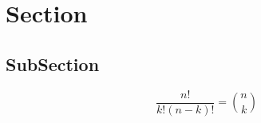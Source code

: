 \documentclass[a4paper]{article}
\begin{document}
\section{Section}

\subsection{SubSection}

\[ \frac{n!}{k!(n-k)!} = \binom{n}{k} \]
\end{document}
